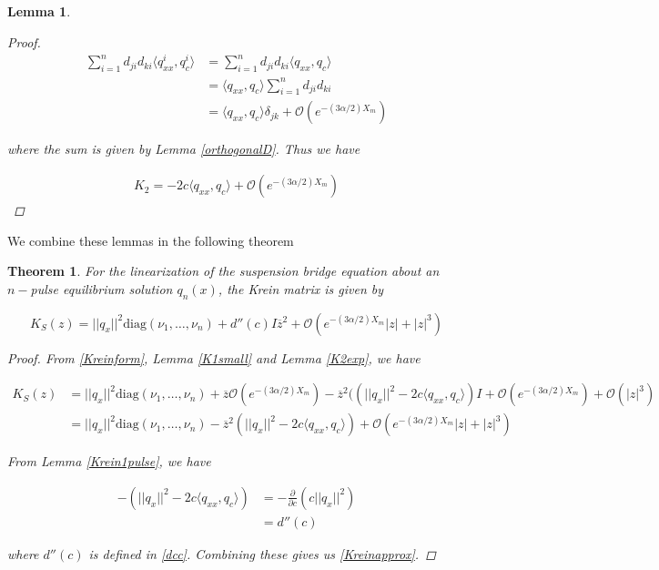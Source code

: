 \documentclass[12pt]{article}
\newtheorem{lemma}{Lemma}
\newtheorem{theorem}{Theorem}
\begin{document}
\begin{lemma}
\begin{proof}
\begin{align*}
\sum_{i = 1}^{n} d_{ji} d_{ki} \langle q^i_{xx}, q^i_c \rangle &= \sum_{i = 1}^{n} d_{ji} d_{ki} \langle q_{xx}, q_c \rangle \\
&= \langle q_{xx}, q_c \rangle \sum_{i = 1}^{n} d_{ji} d_{ki} \\
&= \langle q_{xx}, q_c \rangle \delta_{jk} + \mathcal{O}(e^{-(3 \alpha/2) X_m})
\end{align*}

where the sum is given by Lemma \ref{orthogonalD}. Thus we have

\begin{align*}
K_2 = -2c \langle q_{xx}, q_c \rangle + \mathcal{O}(e^{-(3\alpha /2)X_m})
\end{align*}

\end{proof}
\end{lemma}

We combine these lemmas in the following theorem

\begin{theorem}\label{Kreindiagdom}
For the linearization of the suspension bridge equation about an $n-$pulse equilibrium solution $q_n(x)$, the Krein matrix is given by

\begin{equation}\label{Kreinapprox}
K_S(z) = ||q_x||^2 \text{diag}(\nu_1, \dots, \nu_n)
 + d''(c) I \overline{z}^2 + \mathcal{O}(e^{-(3 \alpha/2) X_m}|z| + |z|^3)
\end{equation}

\begin{proof}

From \eqref{Kreinform}, Lemma \ref{K1small} and Lemma \ref{K2exp}, we have

\begin{align*}
K_S(z) &= ||q_x||^2 \text{diag}(\nu_1, \dots, \nu_n) + \overline{z} \mathcal{O} (e^{-(3 \alpha/2) X_m})
 - \overline{z}^2 ( (||q_x||^2 - 2c \langle q_{xx}, q_c \rangle)I + \mathcal{O}(e^{-(3 \alpha/2) X_m}) + \mathcal{O}(|z|^3) \\
 &= ||q_x||^2 \text{diag}(\nu_1, \dots, \nu_n) 
 - \overline{z}^2 ( ||q_x||^2 - 2c \langle q_{xx}, q_c \rangle) + \mathcal{O}(e^{-(3 \alpha/2) X_m}|z| + |z|^3)
\end{align*}

From Lemma \ref{Krein1pulse}, we have

\begin{align*}
-\left(||q_x||^2 - 2c \langle q_{xx}, q_c \rangle\right) 
&= -\frac{\partial}{\partial c} \left( c||q_x||^2 \right) \\
&= d''(c)
\end{align*}

where $d''(c)$ is defined in \eqref{dcc}. Combining these gives us \eqref{Kreinapprox}. 

\end{proof}
\end{theorem}
\end{document}
